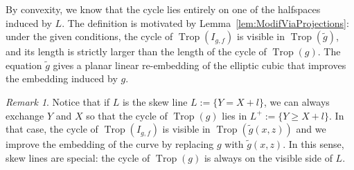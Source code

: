 \documentclass[11pt]{amsart}
\numberwithin{equation}{section}
\theoremstyle{plain}
\theoremstyle{definition}
\theoremstyle{remark}
\newtheorem{remark}[theorem]{Remark}
\begin{document}
By convexity, we know that the cycle lies entirely on one of the
halfspaces induced by $L$. The definition is motivated by
Lemma~\ref{lem:ModifViaProjections}: under the given conditions, the
cycle of $\operatorname{Trop}(I_{g,f})$ is visible in $\operatorname{Trop}(\tilde{g})$, and its
length is strictly larger than the length of the cycle of
$\operatorname{Trop}(g)$. The equation $\tilde{g}$ gives a planar linear
re-embedding of the elliptic cubic that improves the embedding
induced by $g$.

\begin{remark}\label{rem:skewsAreSpecial}
  Notice that if $L$ is the skew line $L:=\{Y=X+l\}$, we can always
  exchange $Y$ and $X$ so that the cycle of $\operatorname{Trop}(g)$ lies in
  $L^+:=\{Y\geq X+l\}$. In that case, the cycle of $\operatorname{Trop}(I_{g,f})$ is
  visible in $\operatorname{Trop}(\tilde{g}(x,z))$ and we improve the embedding of
  the curve by replacing $g$ with $\tilde{g}(x,z)$. In this sense,
  skew lines are special: the cycle of $\operatorname{Trop}(g)$ is always on the
  visible side of $L$.
\end{remark}
\end{document}
